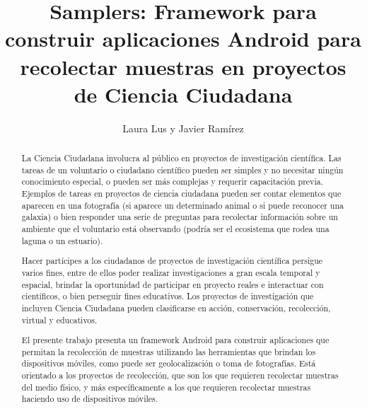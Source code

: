\documentclass[11pt]{report}
\begin{document}
\title{Samplers: Framework para construir aplicaciones Android para recolectar muestras en proyectos de Ciencia Ciudadana}
\author{Laura Lus y Javier Ramírez}

\maketitle

\begin{abstract}


La Ciencia Ciudadana involucra al público en proyectos de investigación científica. Las tareas de un voluntario o ciudadano científico pueden ser simples y no necesitar ningún conocimiento especial, o pueden ser más complejas y requerir capacitación previa. Ejemplos de tareas en proyectos de ciencia ciudadana pueden ser contar elementos que aparecen en una fotografía (si aparece un determinado animal o si puede reconocer una galaxia) o bien responder una serie de preguntas para recolectar información sobre un ambiente que el voluntario está observando (podría ser el ecosistema que rodea una laguna o un estuario). 

Hacer partícipes a los ciudadanos de proyectos de investigación científica persigue varios fines, entre de ellos poder realizar investigaciones a gran escala temporal y espacial, brindar la oportunidad de participar en proyecto reales e interactuar con científicos, o bien perseguir fines educativos. Los proyectos de investigación que incluyen Ciencia Ciudadana pueden clasificarse en acción, conservación, recolección, virtual y educativos. 

El presente trabajo presenta un framework Android para construir aplicaciones que permitan la recolección de muestras utilizando las herramientas que brindan los dispositivos móviles, como puede ser geolocalización o toma de fotografías. Está orientado a los proyectos de recolección, que son los que requieren recolectar muestras del medio físico, y más específicamente a los que requieren recolectar muestras haciendo uso de dispositivos móviles.  

\end{abstract}
\end{document}
